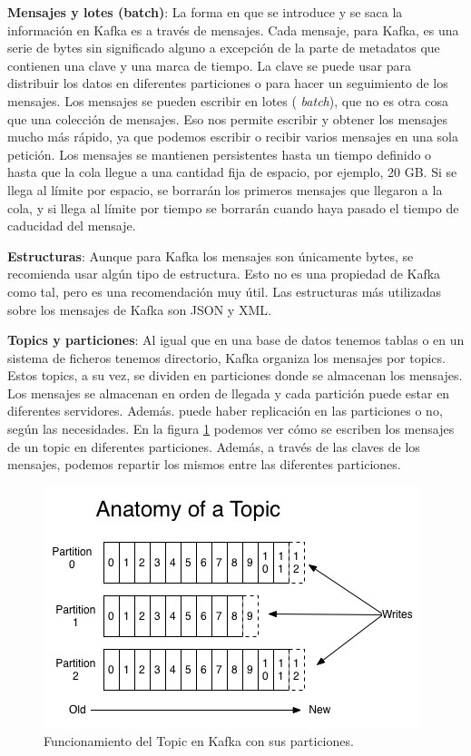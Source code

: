 \textbf{Mensajes y lotes (batch)}: La forma en que se introduce y se saca
la información en Kafka es a través de mensajes. Cada mensaje, para Kafka,
es una serie de bytes sin significado alguno a excepción de la parte de
metadatos que contienen una clave y una marca de tiempo. La clave se puede
usar para distribuir los datos en diferentes particiones o para hacer un
seguimiento de los mensajes. Los mensajes se pueden escribir en lotes ({\em
  batch}), que no es otra cosa que una colección de mensajes. Eso nos
permite escribir y obtener los mensajes mucho más rápido, ya que podemos
escribir o recibir varios mensajes en una sola petición. Los mensajes se
mantienen persistentes hasta un tiempo definido o hasta que la cola llegue
a una cantidad fija de espacio, por ejemplo, 20 GB. Si se llega al límite
por espacio, se borrarán los primeros mensajes que llegaron a la cola, y si
llega al límite por tiempo se borrarán cuando haya pasado el tiempo de
caducidad del mensaje.

\textbf{Estructuras}: Aunque para Kafka los mensajes son únicamente bytes,
se recomienda usar algún tipo de estructura. Esto no es una propiedad de
Kafka como tal, pero es una recomendación muy útil. Las estructuras más
utilizadas sobre los mensajes de Kafka son JSON y XML.

\textbf{Topics y particiones}: Al igual que en una base de datos tenemos
tablas o en un sistema de ficheros tenemos directorio, Kafka organiza los
mensajes por topics. Estos topics, a su vez, se dividen en particiones
donde se almacenan los mensajes. Los mensajes se almacenan en orden de
llegada y cada partición puede estar en diferentes servidores. Además.
puede haber replicación en las particiones o no, según las necesidades. En
la figura \ref{Kfk-img-1} \cite{Kfk-2} podemos ver cómo se escriben los
mensajes de un topic en diferentes particiones. Además, a través de las
claves de los mensajes, podemos repartir los mismos entre las diferentes
particiones.


\begin{figure}[htp]
\centering
\includegraphics[scale=0.75]{Imagenes/kafka1.png}
\caption{Funcionamiento del Topic en Kafka con sus particiones.}
\label{Kfk-img-1}
\end{figure}


